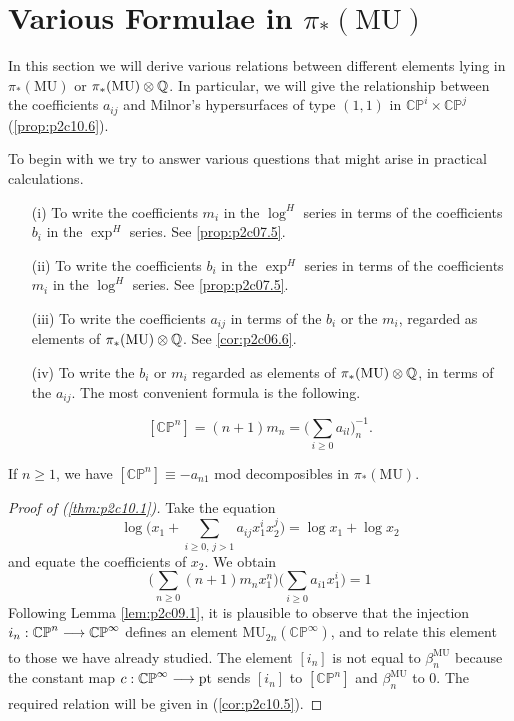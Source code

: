 \documentclass[../main]{subfiles}
\begin{document}
\label{sec:p2c10}
\chapter{Various Formulae in \texorpdfstring{$\pi_\ast(\mathrm{MU})$}{pi (MU)}}
In this section we will derive various relations between different elements lying in $\pi_\ast(\mathrm{MU})$ or $\pi_\ast(\mathrm{MU}) \otimes \mathbb{Q}$. In particular, we will give the relationship between the coefficients $a_{ij}$ and Milnor's hypersurfaces of type $(1,1)$ in $\mathbb {CP}^i \times \mathbb {CP}^j$ (\ref{prop:p2c10.6}).

To begin with we try to answer various questions that might arise in practical calculations.

\begin{enumerate}
    \item[(i)] To write the coefficients $m_i$ in the $\log^H$ series in terms of the coefficients $b_i$ in the $\exp^H$ series. See \ref{prop:p2c07.5}.
    \item[(ii)] To write the coefficients $b_i$ in the $\exp^H$ series in terms of the coefficients $m_i$ in the $\log^H$ series. See \ref{prop:p2c07.5}.
    \item[(iii)] To write the coefficients $a_{ij}$ in terms of the $b_i$ or the $m_i$, regarded as elements of $\pi_\ast(\mathrm{MU}) \otimes \mathbb{Q}$. See \eqref{cor:p2c06.6}.
    \item[(iv)] To write the $b_i$ or $m_i$ regarded as elements of $\pi_\ast(\mathrm {MU}) \otimes \mathbb{Q}$, in terms of the $a_{ij}$. The most convenient formula is the following. 
\end{enumerate}

\begin{theorem}
\label{thm:p2c10.1}
\begin{equation}
        \tag{10.1}
        [\mathbb {CP}^n] = (n + 1)m_n = \bigg(\sum_{i \ge 0} a_{il}\bigg)_n^{-1}.
\end{equation}
\end{theorem}

\begin{corollary}
\label{cor:p2c10.2}
If $n \ge 1$, we have $[\mathbb {CP}^n] \equiv -a_{n1}$ mod decomposibles in $\pi_\ast(\mathrm{MU})$.
\end{corollary}

\begin{proof}[Proof of (\ref{thm:p2c10.1})]
Take the equation \[\log \bigg(x_1 + \sum_{i \ge 0, \, j > 1} a_{ij} x_1^i x_2^j\bigg) = \log x_1 + \log x_2\] and equate the coefficients of $x_2$. We obtain \[\bigg(\sum_{n \ge 0} (n + 1) m_n x_1^n\bigg) \bigg(\sum_{i \ge 0} a_{i1} x_1^i\bigg) = 1\] Following Lemma \ref{lem:p2c09.1}, it is plausible to observe that the injection $i_n : \mathbb {CP}^n \lar{} \mathbb {CP}^\infty$ defines an element $\mathrm {MU}_{2n} (\mathbb {CP}^\infty)$, and to relate this element to those we have already studied. The element $[i_n]$ is not equal to $\beta_n^{\mathrm{MU}}$ because the constant map $c : \mathbb{CP}^\infty \lar{} \mathrm{pt}$ sends $[i_n]$ to $[\mathbb {CP}^n]$ and $\beta_n^{\mathrm{MU}}$ to $0$. The required relation will be given in (\ref{cor:p2c10.5}).
\end{proof}
\end{document}

